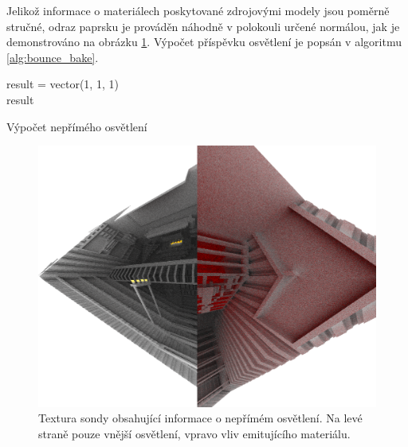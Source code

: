 Jelikož informace o materiálech poskytované zdrojovými modely jsou poměrně stručné, odraz paprsku je prováděn náhodně v polokouli určené normálou, jak je demonstrováno na obrázku \ref{fig:diffuse_rays}. Výpočet příspěvku osvětlení je popsán v algoritmu \ref{alg:bounce_bake}.

\begin{center}
	\begin{czechalgorithm}[H] \label{alg:bounce_bake}
	    result = vector(1, 1, 1)\\
	    \KwRet result
		\caption{Výpočet nepřímého osvětlení}
	\end{czechalgorithm}
\end{center}

\begin{figure}[H]
	\centering
	\includegraphics[scale=1]{images/indirect_probe.png}
	\caption{Textura sondy obsahující informace o nepřímém osvětlení. Na levé straně pouze vnější osvětlení, vpravo vliv emitujícího materiálu.}
	\label{fig:diffuse_rays}
\end{figure}


